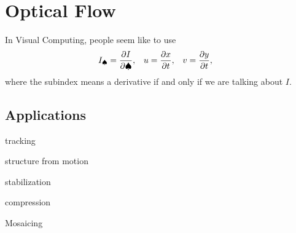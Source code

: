 \setcounter{chapter}{7}
\chapter{Optical Flow}
In Visual Computing, people seem like to use
\begin{align*}
	I_{\spadesuit}&=\frac{\partial I}{\partial \spadesuit},&u&=\frac{\partial x}{\partial t},&v&=\frac{\partial y}{\partial t},
\end{align*}
where the subindex means a derivative if and only if we are talking about $I$.
\section{Applications}
\begin{enumerate*}[label=\protect\circled{\arabic*},itemjoin=]
	\item tracking\\
	\item structure from motion\\
	\item stabilization\\
	\item compression\\
	\item Mosaicing\\
\end{enumerate*}
